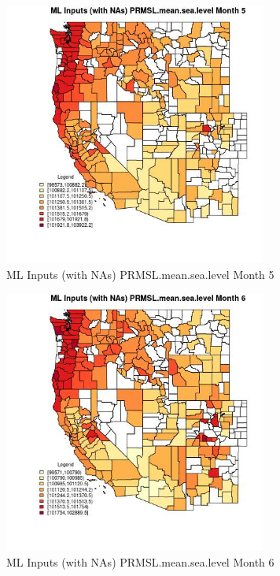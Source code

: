 \begin{figure} 
\centering  
\includegraphics[width=0.77\textwidth]{Code_Outputs/Report_ML_input_PM25_Step4_part_e_de_duplicated_aves_compiled_2019-05-21wNAs_CountyPRMSLmeansealevelmedianMonth5.jpg} 
\caption{\label{fig:Report_ML_input_PM25_Step4_part_e_de_duplicated_aves_compiled_2019-05-21wNAsCountyPRMSLmeansealevelmedianMonth5}ML Inputs (with NAs) PRMSL.mean.sea.level Month 5} 
\end{figure} 
 

\begin{figure} 
\centering  
\includegraphics[width=0.77\textwidth]{Code_Outputs/Report_ML_input_PM25_Step4_part_e_de_duplicated_aves_compiled_2019-05-21wNAs_CountyPRMSLmeansealevelmedianMonth6.jpg} 
\caption{\label{fig:Report_ML_input_PM25_Step4_part_e_de_duplicated_aves_compiled_2019-05-21wNAsCountyPRMSLmeansealevelmedianMonth6}ML Inputs (with NAs) PRMSL.mean.sea.level Month 6} 
\end{figure} 
 

